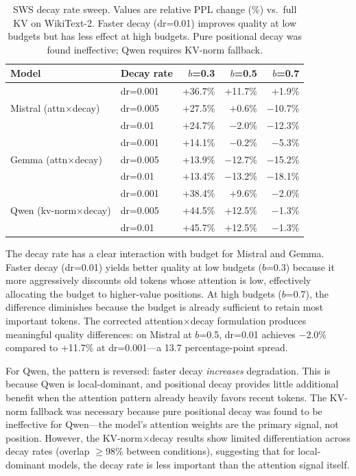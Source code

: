\documentclass[11pt]{article}
\newcommand{\pct}{\%}
\theoremstyle{definition}
\theoremstyle{plain}
\begin{document}
\begin{table}[t]
\centering
\caption{SWS decay rate sweep.  Values are relative PPL change (\%) vs.\ full KV on WikiText-2.  Faster decay (dr=0.01) improves quality at low budgets but has less effect at high budgets.  Pure positional decay was found ineffective; Qwen requires KV-norm fallback.}
\label{tab:decay-scan}
\small
\begin{tabular}{llrrr}
\toprule
Model & Decay rate & $b$=0.3 & $b$=0.5 & $b$=0.7 \\
\midrule
\multirow{3}{*}{Mistral (attn$\times$decay)} 
 & dr=0.001 & +36.7\pct{} & +11.7\pct{} & +1.9\pct{} \\
 & dr=0.005 & +27.5\pct{} & +0.6\pct{} & $-$10.7\pct{} \\
 & dr=0.01  & +24.7\pct{} & $-$2.0\pct{} & $-$12.3\pct{} \\
\midrule
\multirow{3}{*}{Gemma (attn$\times$decay)} 
 & dr=0.001 & +14.1\pct{} & $-$0.2\pct{} & $-$5.3\pct{} \\
 & dr=0.005 & +13.9\pct{} & $-$12.7\pct{} & $-$15.2\pct{} \\
 & dr=0.01  & +13.4\pct{} & $-$13.2\pct{} & $-$18.1\pct{} \\
\midrule
\multirow{3}{*}{Qwen (kv-norm$\times$decay)} 
 & dr=0.001 & +38.4\pct{} & +9.6\pct{} & $-$2.0\pct{} \\
 & dr=0.005 & +44.5\pct{} & +12.5\pct{} & $-$1.3\pct{} \\
 & dr=0.01  & +45.7\pct{} & +12.5\pct{} & $-$1.3\pct{} \\
\bottomrule
\end{tabular}
\end{table}

The decay rate has a clear interaction with budget for Mistral and Gemma.  Faster decay (dr=0.01) yields better quality at low budgets ($b$=0.3) because it more aggressively discounts old tokens whose attention is low, effectively allocating the budget to higher-value positions.  At high budgets ($b$=0.7), the difference diminishes because the budget is already sufficient to retain most important tokens.  The corrected attention$\times$decay formulation produces meaningful quality differences: on Mistral at $b$=0.5, dr=0.01 achieves $-$2.0\pct{} compared to +11.7\pct{} at dr=0.001---a 13.7 percentage-point spread.

For Qwen, the pattern is reversed: faster decay \emph{increases} degradation.  This is because Qwen is local-dominant, and positional decay provides little additional benefit when the attention pattern already heavily favors recent tokens.  The KV-norm fallback was necessary because pure positional decay was found to be ineffective for Qwen---the model's attention weights are the primary signal, not position.  However, the KV-norm$\times$decay results show limited differentiation across decay rates (overlap $\ge$98\pct{} between conditions), suggesting that for local-dominant models, the decay rate is less important than the attention signal itself.
\end{document}
